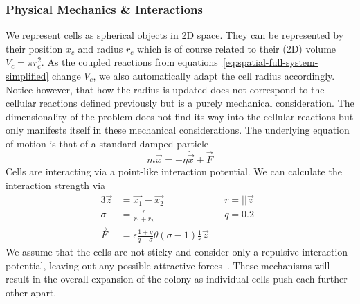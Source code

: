 \documentclass[10pt,twocolumn,5p]{elsarticle}
\numberwithin{equation}{section}
\begin{document}
\subsubsection{Physical Mechanics \& Interactions}
We represent cells as spherical objects in 2D space.
They can be represented by their position $x_c$ and radius $r_c$ which is of course related to their (2D) volume $V_c = \pi r_c^2$.
As the coupled reactions from equations~\eqref{eq:spatial-full-system-simplified} change $V_c$, we also automatically adapt the cell radius accordingly.
Notice however, that how the radius is updated does not correspond to the cellular reactions defined previously but is a purely mechanical consideration.
The dimensionality of the problem does not find its way into the cellular reactions but only manifests itself in these mechanical considerations.
The underlying equation of motion is that of a standard damped particle
\begin{equation}
    m \ddot{\vec{x}} = -\eta\dot{\vec{x}} + \vec{F}
\end{equation}
Cells are interacting via a point-like interaction potential.
We can calculate the interaction strength via
\begin{alignat}{3}
    \vec{z} &= \vec{x_1} - \vec{x_2} \hspace{2em}&& r = ||\vec{z}||\\
    \sigma &= \frac{r}{r_1+r_2} && q=0.2\\
    \vec{F} &= \epsilon \frac{1+q}{q+\sigma} \theta(\sigma - 1) \frac{1}{r}\vec{z}
\end{alignat}
We assume that the cells are not sticky and consider only a repulsive interaction potential, leaving out any possible attractive forces~\cite{Garrett2008}.
These mechanisms will result in the overall expansion of the colony as individual cells push each further other apart.
%
%
%
\end{document}
